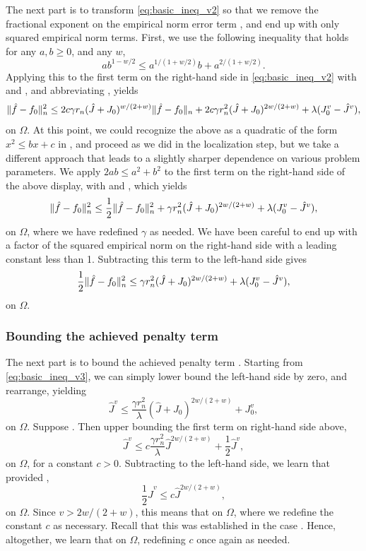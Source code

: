 \documentclass{article}
\begin{document}
The next part is to transform \eqref{eq:basic_ineq_v2} so that we remove the
fractional exponent on the empirical norm error term ,
and end up with only squared empirical norm terms. First, we use the following
inequality that holds for any $a,b \geq 0$, and any $w$,    
\[
a b^{1-w/2} \leq a^{1/(1+w/2)} b + a^{2/(1+w/2)}.
\]
Applying this to the first term on the right-hand side in
\eqref{eq:basic_ineq_v2} with 
and , and abbreviating ,
yields 
\[
\|\hat{f} - f_0\|_n^2 \leq 2c \gamma r_n ({\hat J} + J_0)^{w/(2+w)} \|\hat{f}-f_0\|_n +
2c \gamma r_n^2 ({\hat J} + J_0)^{2w/(2+w)} + \lambda (J_0^v - {\hat J}^v), 
\]
on $\Omega$. At this point, we could recognize the above as a quadratic
of the form $x^2 \leq bx + c$ in , and proceed as we
did in the localization step, but we take a different approach that leads to a
slightly sharper dependence on various problem parameters. We apply $2ab \leq
a^2+b^2$ to the first term on the right-hand side of the above display, with
 and , which yields          
\[
\|\hat{f} - f_0\|_n^2 \leq \frac{1}{2}\|\hat{f} - f_0\|_n^2 + \gamma r_n^2 ({\hat J} +
J_0)^{2w/(2+w)} + \lambda (J_0^v - {\hat J}^v),   
\]
on $\Omega$, where we have redefined $\gamma$ as needed. We have been careful to 
end up with a factor of the squared empirical norm on the right-hand side with a
leading constant less than 1. Subtracting this term  to the left-hand side gives
\begin{equation}
\label{eq:basic_ineq_v3}
\frac{1}{2} \|\hat{f} - f_0\|_n^2 \leq \gamma r_n^2 ({\hat J} + J_0)^{2w/(2+w)} +
\lambda (J_0^v - {\hat J}^v),   
\end{equation}
on $\Omega$. 

\subsubsection{Bounding the achieved penalty term}

The next part is to bound the achieved penalty term . Starting
from \eqref{eq:basic_ineq_v3}, we can simply lower bound the left-hand side by
zero, and rearrange, yielding 
\[
{\hat J}^v \leq \frac{\gamma r_n^2}{\lambda} ({\hat J} + J_0)^{2w/(2+w)} +
J_0^v, 
\]
on $\Omega$. Suppose . Then upper bounding the first term
on right-hand side above,
\[
{\hat J}^v \leq c \frac{\gamma r_n^2}{\lambda} {\hat J}^{2w/(2+w)} +
\frac{1}{2}{\hat J}^v, 
\]
on $\Omega$, for a constant $c>0$. Subtracting 
to the left-hand side, we learn that provided ,  
\[
\frac{1}{2}{\hat J}^v \leq c {\hat J}^{2w/(2+w)},
\]
on $\Omega$. Since $v > 2w/(2+w)$, this means that  on
$\Omega$, where we redefine the constant $c$ as necessary. Recall that this was
established in the case .  Hence, altogether, we learn
that  on $\Omega$, redefining $c$ once
again as needed.     
\end{document}

